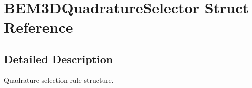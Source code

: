 \section{B\+E\+M3\+D\+Quadrature\+Selector Struct Reference}
\label{structBEM3DQuadratureSelector}


\subsection{Detailed Description}
Quadrature selection rule structure. 